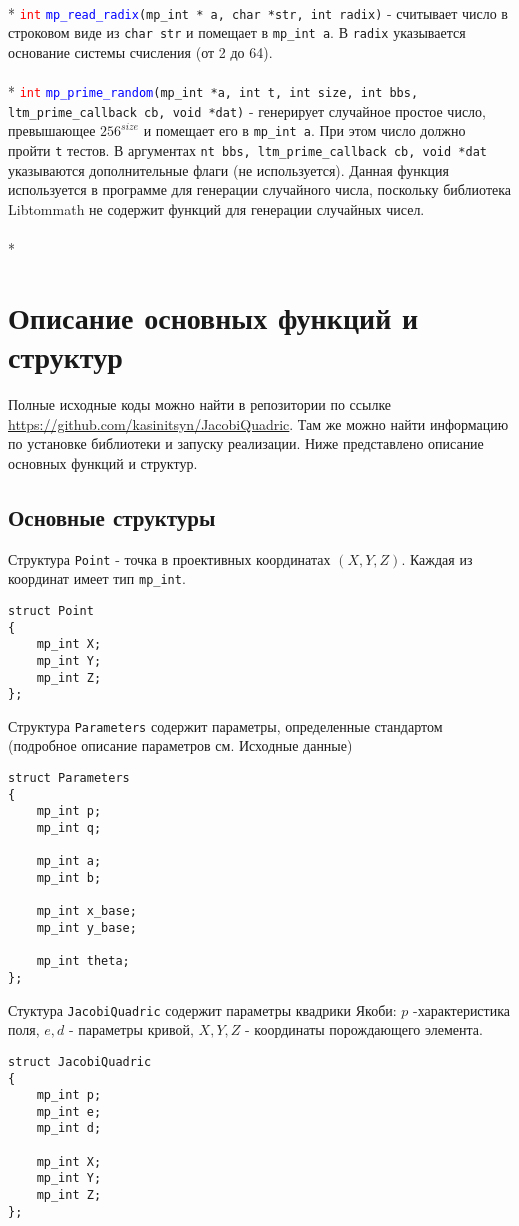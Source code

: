 \documentclass[12pt]{article}
\begin{document}
\\*
\textcolor{red}{\texttt{int}} \textcolor{blue}{\texttt{mp\_read\_radix}}\texttt{(mp\_int * a, char *str, int radix)} - считывает число в строковом виде из \texttt{char str} и помещает в \texttt{mp\_int a}. В \texttt{radix} указывается основание системы счисления (от 2 до 64).\\
\\*
\textcolor{red}{\texttt{int}} \textcolor{blue}{\texttt{mp\_prime\_random}}\texttt{(mp\_int *a, int t, int size, int bbs, ltm\_prime\_callback cb, void *dat)} - генерирует случайное простое число, превышающее $256^{size}$ и помещает его в \texttt{mp\_int a}. При этом число должно пройти \texttt{t} тестов. В аргументах \texttt{nt bbs, ltm\_prime\_callback cb, void *dat} указываются дополнительные флаги (не используется). Данная функция используется в программе для генерации случайного числа, поскольку библиотека Libtommath не содержит функций для генерации случайных чисел.\\ %
\\*


\section{Описание основных функций и структур}
Полные исходные коды можно найти в репозитории по ссылке \url{https://github.com/kasinitsyn/JacobiQuadric}. Там же можно найти информацию по установке библиотеки и запуску реализации. Ниже представлено описание основных функций и структур.
\subsection{Основные структуры}
Структура \texttt{Point} - точка в проективных координатах $(X, Y, Z)$. Каждая из координат имеет тип \texttt{mp\_int}.
\lstset{language=C}
\begin{lstlisting} 
struct Point
{
    mp_int X;
    mp_int Y;
    mp_int Z;
};
\end{lstlisting}
Структура \texttt{Parameters} содержит параметры, определенные стандартом (подробное описание параметров см. Исходные данные)
\lstset{language=C}
\begin{lstlisting} 
struct Parameters
{
    mp_int p;
    mp_int q;

    mp_int a;
    mp_int b;

    mp_int x_base;
    mp_int y_base;

    mp_int theta;
};
\end{lstlisting}
Стуктура \texttt{JacobiQuadric} содержит параметры квадрики Якоби: $p$  -характеристика поля, $e, d$ - параметры кривой, $X, Y, Z$ - координаты порождающего элемента.
\lstset{language=C}
\begin{lstlisting} 
struct JacobiQuadric
{
    mp_int p;
    mp_int e;
    mp_int d;

    mp_int X;
    mp_int Y;
    mp_int Z;
};
\end{lstlisting} 
\end{document}
